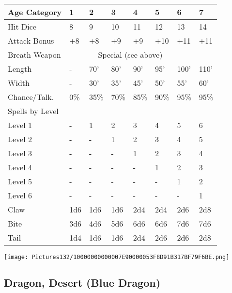 \documentclass[a4paper,twoside,openany,10pt]{book}
\begin{document}
\begin{multicols}{2}
\begin{flushleft}
\begin{tabularx}{0.47\textwidth}{@{}lXXXXXXX@{}}
	Age Category & 1 & 2 & 3 & 4 & 5 & 6 & 7 \\\hline
	Hit Dice & 8 & 9 & 10 & 11 & 12 & 13 & 14 \\\hline
	Attack Bonus & +8 & +8 & +9 & +9 & +10 & +11 & +11 \\\hline
	Breath Weapon &  \multicolumn{6}{c}{Special (see above)}\\\hline
	Length & - & 70' & 80' & 	90' & 95' & 100' &	110' \\\hline
	Width & - & 30' & 35' & 	45' & 50' & 55' &	60' \\\hline
	Chance/Talk. & 0\% & 35\% & 70\% & 85\% & 90\% & 95\% & 95\% \\\hline
	Spells by Level & & & & & & & \\\hline
	Level 1 & - & 1 & 2 & 3 & 4 & 5 & 6 \\\hline
	Level 2 & - & - & 1 & 2 & 3 & 4 & 5 \\\hline
	Level 3 & - & - & - & 1 & 2 & 3 & 4 \\\hline
	Level 4 & - & - & - & - & 1 & 2 & 3 \\\hline
	Level 5 & - & - & - & - & - & 1 & 2 \\\hline
	Level 6 & - & - & - & - & - & - & 1 \\\hline
	Claw & 1d6 & 1d6 & 1d6 & 2d4 & 2d4 & 2d6 & 2d8 \\\hline
	Bite & 3d6 & 4d6 & 5d6 & 6d6 & 6d6 & 7d6 & 7d6 \\\hline
	Tail & 1d4 & 1d6 & 1d6 & 2d4 & 2d6 & 2d6 & 2d8 \\\hline
\end{tabularx}
\end{flushleft}

\vfill

\begin{center}
	\texttt{[image: Pictures132/10000000000007E90000053F8D91B317BF79F6BE.png]}
\end{center}

\pagebreak


\subsection*{Dragon, Desert (Blue Dragon)}\label{dragon-desert-blue-dragon}


\end{multicols}
\end{document}
